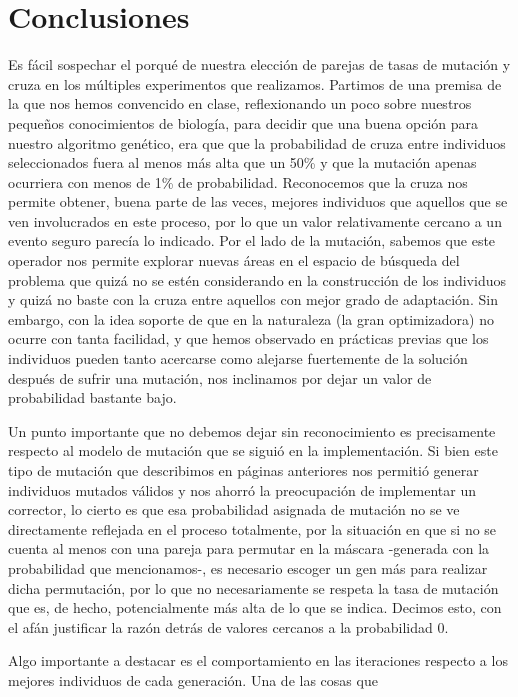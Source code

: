 \documentclass[12pt]{article}
\begin{document}
\section*{Conclusiones}
Es fácil sospechar el porqué de nuestra elección de parejas de tasas de mutación y cruza en
los múltiples experimentos que realizamos.
Partimos de una premisa de la que nos hemos convencido en clase,
reflexionando un poco sobre nuestros pequeños conocimientos de biología,
para decidir que  una buena opción para nuestro algoritmo genético, era que que
la probabilidad de cruza entre individuos seleccionados fuera al menos más alta
que un 50\% y que la mutación apenas ocurriera con menos de 1\% de probabilidad.
Reconocemos que la cruza nos permite obtener, buena parte de las veces, mejores
individuos que aquellos que se ven involucrados en este proceso, por lo que un
valor relativamente cercano a un evento seguro parecía lo indicado.
Por el lado de la mutación, sabemos que este operador nos permite explorar
nuevas áreas en el espacio de búsqueda del problema que quizá no se estén
considerando en la construcción de los individuos y quizá no baste con la cruza
entre aquellos con mejor grado de adaptación. Sin embargo, con la idea
soporte de que en la naturaleza (la gran optimizadora) no ocurre con tanta
facilidad, y que hemos observado en prácticas previas que los individuos pueden
tanto acercarse como alejarse fuertemente de la solución después de sufrir una
mutación, nos inclinamos por dejar un valor de probabilidad bastante bajo. \par
Un punto importante que no debemos dejar sin reconocimiento es precisamente
respecto al modelo de mutación que se siguió en la implementación.
Si bien este tipo de mutación que describimos en páginas anteriores nos permitió
generar individuos mutados válidos y nos ahorró la preocupación de implementar
un corrector, lo cierto es que esa probabilidad asignada de mutación no se ve
directamente reflejada en el proceso totalmente, por la situación en que si
no se cuenta al menos con una pareja para permutar en la máscara -generada con
la probabilidad que mencionamos-, es necesario escoger un gen más para realizar
dicha permutación, por lo que no necesariamente se respeta la tasa de mutación
que es, de hecho, potencialmente más alta de lo que se indica.
Decimos esto, con el afán justificar la razón detrás de valores cercanos a la
probabilidad 0.\par
Algo importante a destacar es el comportamiento en las iteraciones
respecto a los mejores individuos de cada generación. Una de las cosas que
\end{document}
